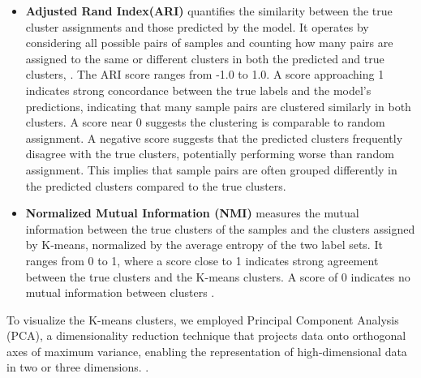 \documentclass[gmd, manuscript]{copernicus}
\begin{document}
\begin{itemize}
 \item  \textbf{Adjusted Rand Index(ARI)}  quantifies the similarity between the true cluster assignments and those predicted by the model. It operates by considering all possible pairs of samples and counting how many pairs are assigned to the same or different clusters in both the predicted and true clusters, \cite{chacon2023minimum, chekir20173d}. The ARI score ranges from -1.0 to 1.0. A score approaching 1 indicates strong concordance between the true labels and the model's predictions, indicating that many sample pairs are clustered similarly in both clusters. A score near 0 suggests the clustering is comparable to random assignment. A negative score suggests that the predicted clusters frequently disagree with the true clusters, potentially performing worse than random assignment. This implies that sample pairs are often grouped differently in the predicted clusters compared to the true clusters.
\item \textbf{Normalized Mutual Information (NMI)} measures the mutual information between the true clusters of the samples and the clusters assigned by K-means, normalized by the average entropy of the two label sets. It ranges from 0 to 1, where a score close to 1 indicates strong agreement between the true clusters and the K-means clusters. A score of 0 indicates no mutual information between clusters \citep{kvaalseth2017normalized}.
\end{itemize}
To visualize the K-means clusters, we employed Principal Component Analysis (PCA), a dimensionality reduction technique that projects data onto orthogonal axes of maximum variance, enabling the representation of high-dimensional data in two or three dimensions. \citep{abdi2010principal}.
\end{document}
